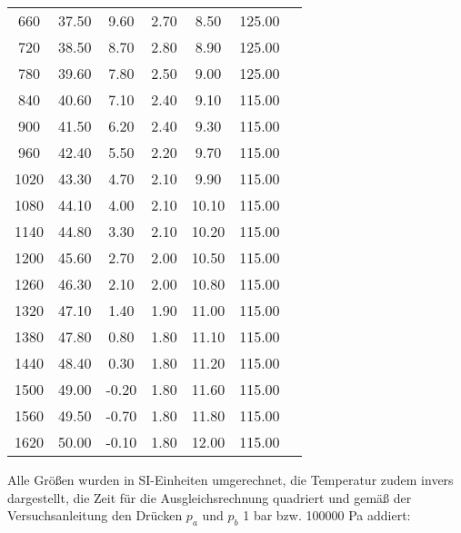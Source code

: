 \begin{table}
\begin{tabular}{c c c c c c c}
      660 &    37.50 &      9.60 &       2.70 &       8.50 & 125.00 \\
      720 &    38.50 &      8.70 &       2.80 &       8.90 & 125.00 \\
      780 &    39.60 &      7.80 &       2.50 &       9.00 & 125.00 \\
      840 &    40.60 &      7.10 &       2.40 &       9.10 & 115.00 \\
      900 &    41.50 &      6.20 &       2.40 &       9.30 & 115.00 \\
      960 &    42.40 &      5.50 &       2.20 &       9.70 & 115.00 \\
    1020 &    43.30 &      4.70 &       2.10 &       9.90 & 115.00 \\
    1080 &    44.10 &      4.00 &       2.10 &      10.10 & 115.00 \\
    1140 &    44.80 &      3.30 &       2.10 &      10.20 & 115.00 \\
    1200 &    45.60 &      2.70 &       2.00 &      10.50 & 115.00 \\
    1260 &    46.30 &      2.10 &       2.00 &      10.80 & 115.00 \\
    1320 &    47.10 &      1.40 &       1.90 &      11.00 & 115.00 \\
    1380 &    47.80 &      0.80 &       1.80 &      11.10 & 115.00 \\
    1440 &    48.40 &      0.30 &       1.80 &      11.20 & 115.00 \\
    1500 &    49.00 &     -0.20 &       1.80 &      11.60 & 115.00 \\
    1560 &    49.50 &     -0.70 &       1.80 &      11.80 & 115.00 \\
    1620 &    50.00 &     -0.10 &       1.80 &      12.00 & 115.00 \\
    \bottomrule
  \end{tabular}
\end{table}

\newpage
Alle Größen wurden in SI-Einheiten umgerechnet, die Temperatur zudem invers dargestellt,
die Zeit für die Ausgleichsrechnung quadriert und gemäß der Versuchsanleitung \cite{v206} den Drücken $\textit{p}_\textit{a}$ und $\textit{p}_\textit{b}$ 1 bar bzw. 100000 Pa addiert:

